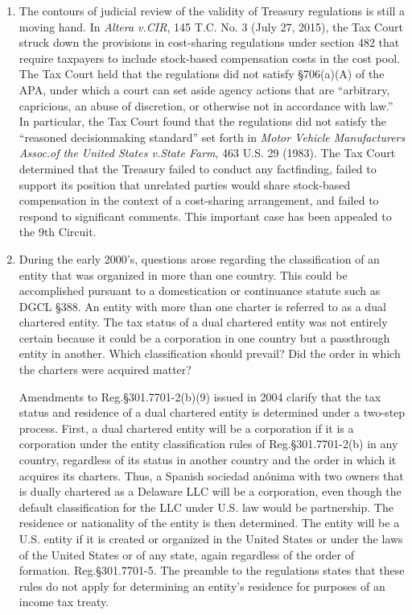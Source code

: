 \begin{enumerate}
		
	\item The contours of judicial review of the validity of Treasury regulations is still a moving hand.  In \textit{Altera v.\@ CIR}, 145 T.C. No. 3 (July 27, 2015), the Tax Court struck down the provisions in cost-sharing regulations under section 482 that require taxpayers to include stock-based compensation costs in the cost pool.  The Tax Court held that the regulations did not satisfy \S706(a)(A) of the APA, under which a court can set aside agency actions that are ``arbitrary, capricious, an abuse of discretion, or otherwise not in accordance with law.''  In particular, the Tax Court found that the regulations did not satisfy the ``reasoned decisionmaking standard'' set forth in \textit{Motor Vehicle Manufacturers Assoc.\@ of the United States v.\@ State Farm}, 463 U.S. 29 (1983).  The Tax Court determined that the Treasury  failed to conduct any factfinding, failed to support its position that unrelated parties would share stock-based compensation in the context of a cost-sharing arrangement, and failed to respond to significant comments.  This important case has been appealed to the 9th Circuit.

	\item During the early 2000's, questions arose regarding the classification of an entity that was organized in more than one country.  This could be accomplished pursuant to a domestication or continuance statute such as DGCL \S388.  An entity with more than one charter is referred to as a dual chartered entity.  The tax status of a dual chartered entity was not entirely certain because it could be a corporation in one country but a passthrough entity in another.  Which classification should prevail?  Did the order in which the charters were acquired matter?  

Amendments to Reg.\@ \S301.7701-2(b)(9) issued in 2004 clarify that the tax status and residence of a dual chartered entity is determined under a two-step process.  First, a dual chartered entity will be a corporation if it is a corporation under the entity classification rules of Reg.\@  \S301.7701-2(b) in any country, regardless of its status in another country and the order in which it acquires its charters.  Thus, a Spanish sociedad an\'{o}nima with two owners that is dually chartered as a Delaware LLC will be a corporation, even though the default classification for the LLC under U.S. law would be partnership.  The residence or nationality of the entity is then determined.  The entity will be a U.S. entity if it is created or organized in the United States or under the laws of the United States or of any state, again regardless of the order of formation.  Reg.\@ \S301.7701-5.  The preamble to the regulations states that these rules do not apply for determining an entity's residence for purposes of an income tax treaty.      		
	\end{enumerate}		

